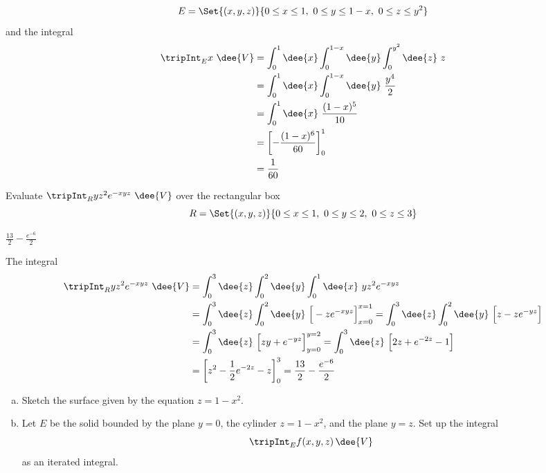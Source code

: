\begin{solution}
\begin{equation*}
E=\Set{(x,y,z)}{0\le x\le 1,\ 0\le y\le 1-x,\ 0\le z\le y^2}
\end{equation*}
and the integral
\begin{align*}
\tripInt_E x\ \dee{V}
&=\int_0^1\dee{x}\int_0^{1-x}\dee{y}\int_0^{y^2}\dee{z}\ z \\
&=\int_0^1\dee{x}\int_0^{1-x}\dee{y}\ \frac{y^4}{2} \\
&=\int_0^1\dee{x}\ \frac{(1-x)^5}{10} \\
&=\left[-\frac{(1-x)^6}{60}\right]_0^1 \\
&=\frac{1}{60}
\end{align*} 
\end{solution}

\begin{question}[M200 2012D] %
Evaluate  $\tripInt_R yz^2 e^{-xyz}\ \dee{V}$ over the rectangular
box
\begin{equation*}
R=\Set{(x,y,z)}{0\le x\le 1,\ 0\le y\le 2,\  0\le z\le 3}
\end{equation*} 
\end{question}

%

\begin{answer}
$\frac{13}{2}-\frac{e^{-6}}{2}$
\end{answer}

\begin{solution}
The integral
\begin{align*}
\tripInt_R yz^2 e^{-xyz}\ \dee{V}
&=\int_0^3\dee{z}\int_0^2\dee{y}\int_0^1\dee{x}\ yz^2 e^{-xyz} \\
&=\int_0^3\dee{z}\int_0^2\dee{y}\ \Big[-z e^{-xyz}\Big]_{x=0}^{x=1} 
  =\int_0^3\dee{z}\int_0^2\dee{y}\ \Big[z-z e^{-yz}\Big] \\
&=\int_0^3\dee{z}\ \Big[zy+ e^{-yz}\Big]_{y=0}^{y=2}
=\int_0^3\dee{z}\ \Big[2z+ e^{-2z}-1\Big] \\
&=\left[z^2-\frac{1}{2} e^{-2z}-z\right]_0^3 
=\frac{13}{2}-\frac{e^{-6}}{2}
\end{align*}
\end{solution}

\begin{question}[M200 2013D] %
\begin{enumerate}[(a)]
\item
Sketch the surface given by the equation $z = 1 - x^2$.
\item
Let $E$ be the solid bounded by the plane $y = 0$, the cylinder 
$z = 1 - x^2$, and the plane $y = z$. Set up the integral
\begin{equation*}
\tripInt_E f(x,y,z)\,\dee{V}
\end{equation*}
as an iterated integral.
\end{enumerate}
\end{question}

